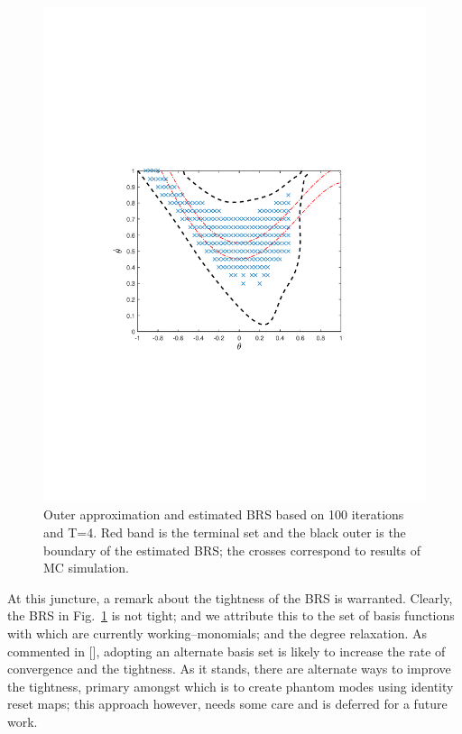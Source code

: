 \begin{figure}[!t]
  \includegraphics[trim=1.5in 3.3in 1.5in 3.5in, clip=true,width=\columnwidth]{figures/rw_0p1_4}
  \caption{Outer approximation and estimated BRS based on 100 iterations and T=4. Red band is the terminal set and the black outer is the boundary of the estimated BRS; the crosses correspond to results of MC simulation.}
  \label{fig:rw_brs}
\end{figure}
\par
At this juncture, a remark about the tightness of the BRS is warranted. Clearly, the BRS in Fig.~\ref{fig:rw_brs} is not tight; and we attribute this to the set of basis functions with which are currently working--monomials; and the degree relaxation. As commented in [], adopting an alternate basis set is likely to increase the rate of convergence and the tightness. As it stands, there are alternate ways to improve the tightness, primary amongst which is to create phantom modes using identity reset maps; this approach however, needs some care and is deferred for a future work.
